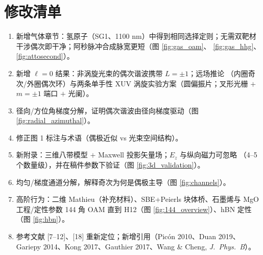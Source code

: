 \documentclass[11pt,a4paper]{ctexart}
\begin{document}
\section*{修改清单}

\begin{enumerate}[label=\arabic*.]
  \item 新增气体章节：氢原子（SG1、1100 nm）中得到相同选择定则；无需双靶材
  干涉偶次即干净；阿秒脉冲合成脉宽更短（图 \ref{fig:gas_oam}、
  \ref{fig:gas_hhg}、\ref{fig:attosecond}）。
  \item 新增 $\ell=0$ 结果：非涡旋光束的偶次谐波携带 $L=\pm1$；远场推论
  （内圈奇次/外圈偶次环）与两条单手性 XUV 涡旋实验方案（圆偏振片；叉形光栅
  $+$ $m=\pm1$ 端口 $+$ 光阑）。
  \item 径向/方位角梯度分解，证明偶次谐波由径向梯度驱动（图 \ref{fig:radial_azimuthal}）。
  \item 修正图 1 标注与术语（偶极近似 vs 光束空间结构）。
  \item 新附录：三维八带模型 $+$ Maxwell 投影矢量场；$E_z$ 与纵向磁力可忽略
  （4--5 个数量级），并在稿件参数下验证（图 \ref{fig:3d_validation}）。
  \item 均匀/梯度通道分解，解释奇次为何是偶极主导（图 \ref{fig:channels}）。
  \item 高阶行为：二维 Mathieu（补充材料）、SBE+Peierls 块体桥、石墨烯与 MgO
  工程/定性参数 144 角 OAM 直到 H12（图 \ref{fig:144_overview}）、hBN 定性
  （图 \ref{fig:hbn}）。
  \item 参考文献 [7--12]、[18] 重新定位；新增引用（Pic\'on 2010、Duan 2019、
  Gariepy 2014、Kong 2017、Gauthier 2017、Wang \& Cheng, \emph{J.\ Phys.\ B}）。
\end{enumerate}
\end{document}
